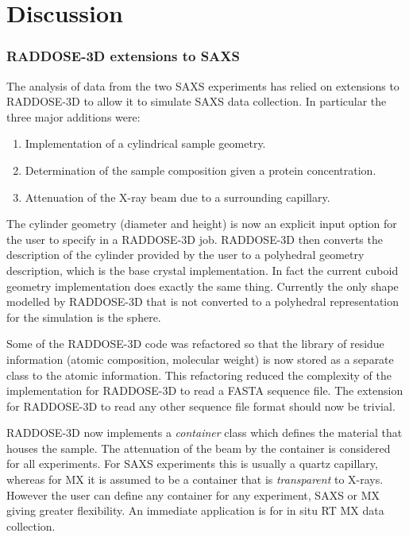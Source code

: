 \section{Discussion}
\label{sec:Discussion - SAXS}

\subsubsection{RADDOSE-3D extensions to SAXS}
\label{subs:RADDOSE-3D extensions to SAXS}

The analysis of data from the two SAXS experiments has relied on extensions to RADDOSE-3D to allow it to simulate SAXS data collection.
In particular the three major additions were:
\begin{enumerate}
    \item Implementation of a cylindrical sample geometry.
    \item Determination of the sample composition given a protein concentration.
    \item Attenuation of the X-ray beam due to a surrounding capillary.
\end{enumerate}
The cylinder geometry (diameter and height) is now an explicit input option for the user to specify in a RADDOSE-3D job.
RADDOSE-3D then converts the description of the cylinder provided by the user to a polyhedral geometry description, which is the base crystal implementation.
In fact the current cuboid geometry implementation does exactly the same thing.
Currently the only shape modelled by RADDOSE-3D that is not converted to a polyhedral representation for the simulation is the sphere.

Some of the RADDOSE-3D code was refactored so that the library of residue information (atomic composition, molecular weight) is now stored as a separate class to the atomic information. This refactoring reduced the complexity of the implementation for RADDOSE-3D to read a FASTA sequence file. The extension for RADDOSE-3D to read any other sequence file format should now be trivial.

RADDOSE-3D now implements a \textit{container} class which defines the material that houses the sample.
The attenuation of the beam by the container is considered for all experiments.
For SAXS experiments this is usually a quartz capillary, whereas for MX it is assumed to be a container that is \textit{transparent} to X-rays.
However the user can define any container for any experiment, SAXS or MX giving greater flexibility.
An immediate application is for in situ RT MX data collection.


